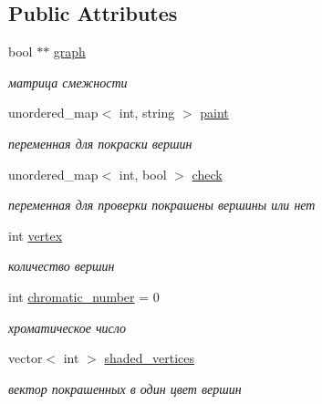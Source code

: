\subsection*{Public Attributes}
\begin{DoxyCompactItemize}
\item 
bool $\ast$$\ast$ \mbox{\hyperlink{class_graph_a11d8c4f9e352a53522578b7d121b4c2c}{graph}}
\begin{DoxyCompactList}\small\item\em матрица смежности \end{DoxyCompactList}\item 
\mbox{\label{class_graph_a5370391b46f881531a58c969e1a26150}} 
unordered\+\_\+map$<$ int, string $>$ \mbox{\hyperlink{class_graph_a5370391b46f881531a58c969e1a26150}{paint}}
\begin{DoxyCompactList}\small\item\em переменная для покраски вершин \end{DoxyCompactList}\item 
\mbox{\label{class_graph_a7360ef28a6c34ec1d2d9eb436935e354}} 
unordered\+\_\+map$<$ int, bool $>$ \mbox{\hyperlink{class_graph_a7360ef28a6c34ec1d2d9eb436935e354}{check}}
\begin{DoxyCompactList}\small\item\em переменная для проверки покрашены вершины или нет \end{DoxyCompactList}\item 
\mbox{\label{class_graph_a34e647deffeebd4408149691f594a52f}} 
int \mbox{\hyperlink{class_graph_a34e647deffeebd4408149691f594a52f}{vertex}}
\begin{DoxyCompactList}\small\item\em количество вершин \end{DoxyCompactList}\item 
\mbox{\label{class_graph_afac053e82e7ca5be4a5e5484f06fee7e}} 
int \mbox{\hyperlink{class_graph_afac053e82e7ca5be4a5e5484f06fee7e}{chromatic\+\_\+number}} = 0
\begin{DoxyCompactList}\small\item\em хроматическое число \end{DoxyCompactList}\item 
\mbox{\label{class_graph_add6e039d5c8c8f74cc8492ff1f4cfbc5}} 
vector$<$ int $>$ \mbox{\hyperlink{class_graph_add6e039d5c8c8f74cc8492ff1f4cfbc5}{shaded\+\_\+vertices}}
\begin{DoxyCompactList}\small\item\em вектор покрашенных в один цвет вершин \end{DoxyCompactList}\end{DoxyCompactItemize}


